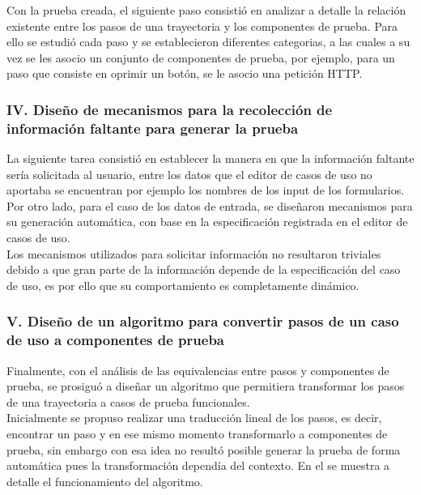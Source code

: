 	Con la prueba creada, el siguiente paso consistió en analizar a detalle la relación existente entre los pasos de una trayectoria y los componentes de prueba. Para ello se estudió cada paso y se establecieron diferentes categorias, a las cuales a su vez se les asocio un conjunto de componentes de prueba, por ejemplo, para un paso que consiste en oprimir un botón, se le asocio una petición HTTP.
	
	
	\subsubsection{IV. Diseño de mecanismos para la recolección de información faltante para generar la prueba}

	La siguiente tarea consistió en establecer la manera en que la información faltante sería solicitada al usuario, entre los datos que el editor de casos de uso no aportaba se encuentran por ejemplo los nombres de los input de los formularios. Por otro lado, para el caso de los datos de entrada, se diseñaron mecanismos para su generación automática, con base en la especificación registrada en el editor de casos de uso.\\
	 Los mecanismos utilizados para solicitar información no resultaron triviales debido a que gran parte de la información depende de la especificación del caso de uso, es por ello que su comportamiento es completamente dinámico.
	

	\subsubsection{V. Diseño de un algoritmo para convertir pasos de un caso de uso a componentes de prueba}
	
	Finalmente, con el análisis de las equivalencias entre pasos y componentes de prueba, se prosiguó a diseñar un algoritmo que permitiera transformar los pasos de una trayectoria a casos de prueba funcionales.\\
	Inicialmente se propuso realizar una traducción lineal de los pasos, es decir, encontrar un paso y en ese mismo momento transformarlo a componentes de prueba, sin embargo con esa idea no resultó posible generar la prueba de forma automática pues la transformación dependía del contexto. En el  se muestra a detalle el funcionamiento del algoritmo.
	